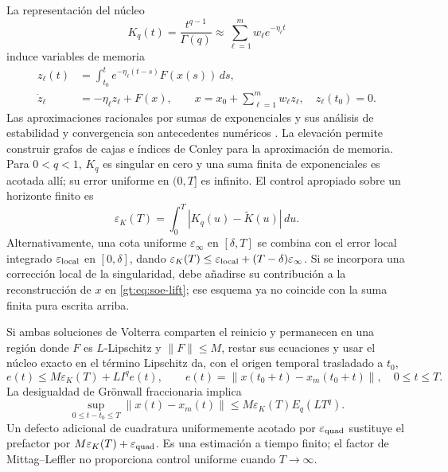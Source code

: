 La representación del núcleo
\begin{equation}
 K_q(t)=\frac{t^{q-1}}{\Gamma(q)}
 \approx\sum_{\ell=1}^{m}w_\ell e^{-\eta_\ell t}
 \label{gt:eq:soe-kernel}
\end{equation}
induce variables de memoria
\begin{align}
 z_\ell(t)&=\int_{t_0}^{t}e^{-\eta_\ell(t-s)}F(x(s))\,ds,\\
 \dot z_\ell&=-\eta_\ell z_\ell+F(x),
 \qquad
 x=x_0+\sum_{\ell=1}^{m}w_\ell z_\ell,
 \quad z_\ell(t_0)=0.
 \label{gt:eq:soe-lift}
\end{align}
Las aproximaciones racionales por sumas de exponenciales y sus análisis de
estabilidad y convergencia son antecedentes numéricos
\cite{KhristenkoWohlmuth2023Rational}. La elevación permite construir
grafos de cajas e índices de Conley para la aproximación de memoria.
Para $0<q<1$, $K_q$ es singular en cero y una suma finita de exponenciales
es acotada allí; su error uniforme en $(0,T]$ es infinito. El control
apropiado sobre un horizonte finito es
\begin{equation}
 \varepsilon_K(T)=\int_0^T|K_q(u)-\widetilde K(u)|\,du.
 \label{gt:eq:soe-L1-kernel-error}
\end{equation}
Alternativamente, una cota uniforme $\varepsilon_\infty$ en $[\delta,T]$
se combina con el error local integrado $\varepsilon_{\rm local}$ en
$[0,\delta]$, dando
$\varepsilon_K(T)\le\varepsilon_{\rm local}+(T-\delta)\varepsilon_\infty$.
Si se incorpora una corrección local de la singularidad, debe añadirse su
contribución a la reconstrucción de $x$ en \eqref{gt:eq:soe-lift}; ese esquema
ya no coincide con la suma finita pura escrita arriba.

Si ambas soluciones de Volterra comparten el reinicio y permanecen en una
región donde $F$ es $L$-Lipschitz y $\|F\|\le M$, restar sus ecuaciones y
usar el núcleo exacto en el término Lipschitz da, con el origen temporal
trasladado a $t_0$,
\[
 e(t)\le M\varepsilon_K(T)+L I^qe(t),\qquad
 e(t)=\|x(t_0+t)-x_m(t_0+t)\|,\quad 0\le t\le T.
\]
La desigualdad de Grönwall fraccionaria implica
\begin{equation}
 \sup_{0\le t-t_0\le T}\|x(t)-x_m(t)\|
 \le M\varepsilon_K(T)E_q(LT^q).
 \label{gt:eq:soe-finite-solution-error}
\end{equation}
Un defecto adicional de cuadratura uniformemente acotado por
$\varepsilon_{\rm quad}$ sustituye el prefactor por
$M\varepsilon_K(T)+\varepsilon_{\rm quad}$. Es una estimación a tiempo
finito; el factor de Mittag--Leffler no proporciona control uniforme cuando
$T\to\infty$.

